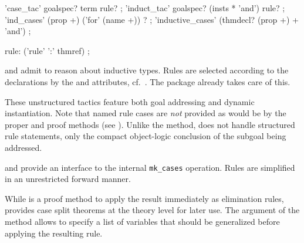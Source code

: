 \begin{isabellebody}
\begin{isamarkuptext}
  \begin{rail}
    'case\_tac' goalspec? term rule?
    ;
    'induct\_tac' goalspec? (insts * 'and') rule?
    ;
    'ind\_cases' (prop +) ('for' (name +)) ?
    ;
    'inductive\_cases' (thmdecl? (prop +) + 'and')
    ;

    rule: ('rule' ':' thmref)
    ;
  \end{rail}

  \begin{description}

  \item \hyperlink{method.HOL.case-tac}{\mbox{}} and \hyperlink{method.HOL.induct-tac}{\mbox{}} admit
  to reason about inductive types.  Rules are selected according to
  the declarations by the \hyperlink{attribute.cases}{\mbox{}} and \hyperlink{attribute.induct}{\mbox{}}
  attributes, cf.\ .  The \hyperlink{command.HOL.datatype}{\mbox{}} package already takes care of this.

  These unstructured tactics feature both goal addressing and dynamic
  instantiation.  Note that named rule cases are \emph{not} provided
  as would be by the proper \hyperlink{method.cases}{\mbox{}} and \hyperlink{method.induct}{\mbox{}} proof
  methods (see ).  Unlike the \hyperlink{method.induct}{\mbox{}} method, \hyperlink{method.induct-tac}{\mbox{}} does not handle structured rule
  statements, only the compact object-logic conclusion of the subgoal
  being addressed.
  
  \item \hyperlink{method.HOL.ind-cases}{\mbox{}} and \hyperlink{command.HOL.inductive-cases}{\mbox{}} provide an interface to the internal \verb|mk_cases| operation.  Rules are simplified in an unrestricted
  forward manner.

  While \hyperlink{method.HOL.ind-cases}{\mbox{}} is a proof method to apply the
  result immediately as elimination rules, \hyperlink{command.HOL.inductive-cases}{\mbox{}} provides case split theorems at the theory level
  for later use.  The \hyperlink{keyword.for}{\mbox{}} argument of the \hyperlink{method.HOL.ind-cases}{\mbox{}} method allows to specify a list of variables that should
  be generalized before applying the resulting rule.


\end{description}
\end{isamarkuptext}
\end{isabellebody}

